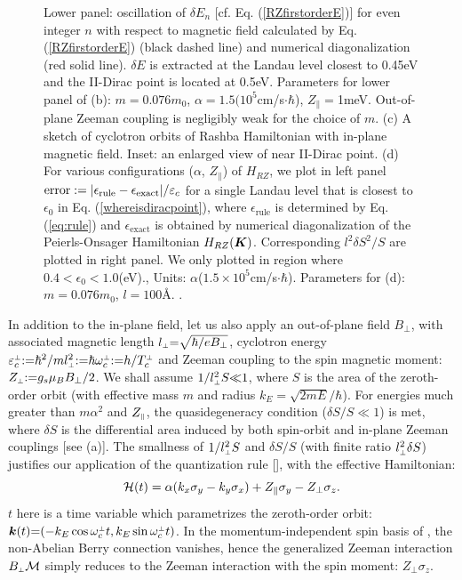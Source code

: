 \documentclass[aps, prb, showpacs, twocolumn, notitlepage, superscriptaddress]{revtex4-1}
\begin{document}
\begin{figure}
{Lower panel: oscillation of $\delta E_n$ [cf. Eq. (\ref{RZfirstorderE})] for even integer $n$ with respect to magnetic field calculated by Eq. (\ref{RZfirstorderE}) (black dashed line) and numerical diagonalization (red solid line). $\delta E$ is extracted at the Landau level closest to 0.45eV and the II-Dirac point is located at 0.5eV. Parameters for lower panel of (b): $m{=}0.076m_0$, $\alpha{=} 1.5(10^{5}$cm/s$\cdot\hbar$), $Z_\parallel {=}$1meV. Out-of-plane Zeeman coupling is negligibly weak for the choice of $m$. (c) A sketch of cyclotron orbits of Rashba Hamiltonian with in-plane magnetic field. Inset: an enlarged view of near II-Dirac point. (d) For various configurations ($\alpha$, $Z_\parallel$) of $H_{RZ}$, we plot in left panel $\text{error}:=|\epsilon_\text{rule}-\epsilon_\text{exact}|/\varepsilon_c$ for a single Landau level that is closest to $\epsilon_0$ in Eq. (\ref{whereisdiracpoint}), where $\epsilon_\text{rule}$ is determined by Eq. (\ref{eq:rule}) and $\epsilon_{\text{exact}}$ is obtained by numerical diagonalization of the Peierls-Onsager Hamiltonian $H_{RZ}(\boldsymbol{K})$. Corresponding $l^2 \delta S^2/S$ are plotted in right panel. We only plotted in region where $0.4{<}\epsilon_0{<}1.0$(eV).\cite{RZfignote}, Units: $\alpha$($1.5\times 10^{5}$cm/s$\cdot\hbar$). Parameters for (d): $m=0.076m_0$, $l=100$\AA. \label{fig:RZ}}.
\end{figure}

In addition to the in-plane field, let us also apply an out-of-plane field $B_{\perp}$, with associated magnetic length $l_{\scriptscriptstyle{\perp}}{=}\sqrt{\hbar/eB_{\perp}}$, cyclotron energy $\varepsilon^{\scriptscriptstyle{\perp}}_c{:}{=}\hbar^2/ml_{\scriptscriptstyle{\perp}}^2{:}{=}\hbar \omega_c^{\scriptscriptstyle{\perp}}{:}{=}h/T_c^{\scriptscriptstyle{\perp}}$ and Zeeman coupling to the spin magnetic moment:  $Z_{\scriptscriptstyle{\perp}}{:}{=}{g_s}\mu_B B_{\perp}/2$. We shall assume  $1/l_{\scriptscriptstyle{\perp}}^2S{\ll}1$, where $S$ is the area of the zeroth-order orbit (with effective mass $m$ and radius $k_E{=}\sqrt{2mE}/\hbar$). For energies much greater than $m\alpha^2$ and $Z_{\scriptscriptstyle{\parallel}}$, the quasidegeneracy condition ($\delta S/S{\ll}1$) is met, where $\delta S$ is the differential area induced by both spin-orbit and in-plane Zeeman couplings [see (a)].  The smallness of $1/l_{\scriptscriptstyle{\perp}}^2S$ and $\delta S/S$ (with finite ratio $l_{\scriptscriptstyle{\perp}}^2\delta S$) justifies our application of the quantization rule [],  with the effective Hamiltonian: 
\begin{equation}
{\cal H}(t)=\alpha(k_{x}\sigma_{y}-k_{y}\sigma_{x})+Z_\parallel\sigma_{y}-Z_\perp\sigma_{z}.\label{calHRZ}
\end{equation}
$t$ here is a time variable which parametrizes the zeroth-order orbit:
$\boldsymbol{k}(t){=}({-}k_E \cos \omega_c^{\scriptscriptstyle{\perp}} t, k_E \sin \omega_c^{\scriptscriptstyle{\perp}} t )$. In the momentum-independent spin basis of , the non-Abelian Berry connection vanishes, hence the generalized Zeeman interaction $B_{\scriptscriptstyle{\perp}}{\cal M}$ simply reduces to the Zeeman interaction with the spin  moment: $Z_\perp\sigma_{z}$.
\end{document}

